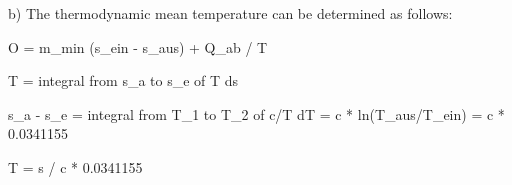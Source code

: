 b) The thermodynamic mean temperature can be determined as follows:

O = m_min (s_ein - s_aus) + Q_ab / T

T = integral from s_a to s_e of T ds

s_a - s_e = integral from T_1 to T_2 of c/T dT = c * ln(T_aus/T_ein) = c * 0.0341155

T = s / c * 0.0341155